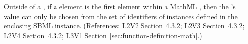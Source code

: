 Outside of a \FunctionDefinition, if a  element is the
first element within a MathML , then the 's
value can only be chosen from the set of identifiers of
\FunctionDefinition{} instances defined in the
enclosing SBML \Model instance.
(References: L2V2 Section~4.3.2; L2V3 Section~4.3.2; L2V4 Section~4.3.2;
L3V1 Section~\ref{sec:function-definition-math}.)
